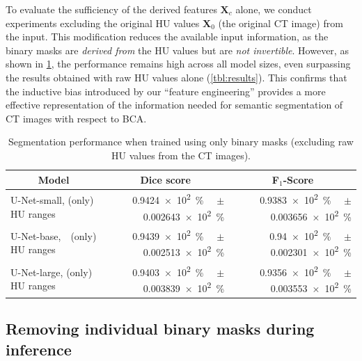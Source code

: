 \documentclass[conference]{IEEEtran}
\let\bm\mathbf
\newcommand\formatpercentage[2][round-precision = 1]{%
    \SI[round-mode = places,
        scientific-notation = fixed, fixed-exponent = 0,
        output-decimal-marker={.}, #1]{#2e2}{\percent}%
}
\begin{document}
To evaluate the sufficiency of the derived features $\bm{X}_c$ alone, we conduct experiments excluding the original HU values $\bm{X}_0$ (the original CT image) from the input. This modification reduces the available input information, as the binary masks are \emph{derived from} the HU values but are \emph{not invertible}.
However, as shown in \cref{tbl:results-hut}, the performance remains high across all model sizes, even surpassing the results obtained with raw HU values alone (\cref{tbl:results}).
This confirms that the inductive bias introduced by our ``feature engineering'' provides a more effective representation of the information needed for semantic segmentation of CT images with respect to BCA.

\begin{table}[t]
    \caption{Segmentation performance when trained using only binary masks (excluding raw HU values from the CT images).}
     \begin{center}
    \begin{tabular}{lrr}
        \toprule
        \multicolumn{1}{c}{\textbf{Model}} 
        & \multicolumn{1}{c}{\textbf{Dice score}} 
        & \multicolumn{1}{c}{\textbf{F$_1$-Score}} \\
        \midrule
        U-Net-small, (only) HU ranges                      
        & \formatpercentage{0.9424}\ \ $\pm$\formatpercentage{0.002643} 
        & \formatpercentage{0.9383}\ \ $\pm$\formatpercentage{0.003656}  \\
        \midrule
        U-Net-base,\ \ (only) HU ranges
        & \formatpercentage{0.9439}\ \ $\pm$\formatpercentage{0.002513} 
        & \formatpercentage{0.94}\ \ $\pm$\formatpercentage{0.002301} \\
        \midrule
        U-Net-large, (only) HU ranges                       
        & \formatpercentage{0.9403}\ \ $\pm$\formatpercentage{0.003839}  
        & \formatpercentage{0.9356}\ \ $\pm$\formatpercentage{0.003553} \\
        \bottomrule
    \end{tabular}
    \label{tab:results-no-hu-values} \label{tbl:results-hut}
     \end{center}
\end{table}

\subsection{Removing individual binary masks during inference} \label{sec:remove-masks}
\end{document}
